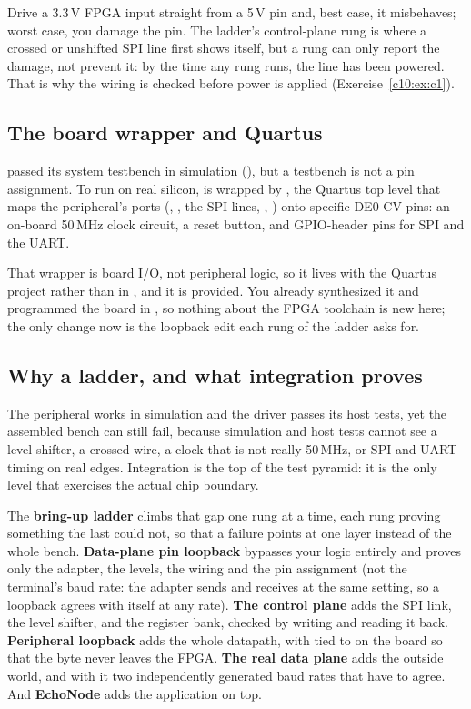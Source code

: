 Drive a 3.3\,V FPGA input straight from a 5\,V pin and, best case, it misbehaves; worst case, you
damage the pin. The ladder's control-plane rung is where a crossed or unshifted SPI line first shows
itself, but a rung can only report the damage, not prevent it: by the time any rung runs, the line
has been powered. That is why the wiring is checked before power is applied
(Exercise~\ref{c10:ex:c1}).

\subsection{The board wrapper and Quartus}
\label{c10:sec:wrapper}
 passed its system testbench in simulation (), but a testbench is not a pin
assignment. To run on real silicon,  is wrapped by \textbf{}, the
Quartus top level that maps the peripheral's ports (, , the SPI lines,
, ) onto specific DE0-CV pins: an on-board 50\,MHz clock circuit, a reset button,
and GPIO-header pins for SPI and the UART.

That wrapper is board I/O, not peripheral logic, so it lives with the Quartus project rather than in
, and it is provided. You already synthesized it and programmed the board in ,
so nothing about the FPGA toolchain is new here; the only change now is the loopback edit each rung
of the ladder asks for.

\subsection{Why a ladder, and what integration proves}
\label{c10:sec:ladder}
The peripheral works in simulation and the driver passes its host tests, yet the assembled bench can
still fail, because simulation and host tests cannot see a level shifter, a crossed wire, a clock
that is not really 50\,MHz, or SPI and UART timing on real edges. Integration is the top of the test
pyramid: it is the only level that exercises the actual chip boundary.

The \textbf{bring-up ladder} climbs that gap one rung at a time, each rung proving something the
last could not, so that a failure points at one layer instead of the whole bench. \textbf{Data-plane
pin loopback} bypasses your logic entirely and proves only the adapter, the levels, the wiring and the
pin assignment (not the terminal's baud rate: the adapter sends and receives at the same setting, so a loopback agrees with itself at any rate). \textbf{The control plane} adds the SPI link, the level shifter,
 and the register bank, checked by writing  and reading it back.
\textbf{Peripheral loopback} adds the whole datapath, with  tied to  on the board
so that the byte never leaves the FPGA. \textbf{The real data plane} adds the outside world, and with
it two independently generated baud rates that have to agree. And \textbf{EchoNode} adds the
application on top.

